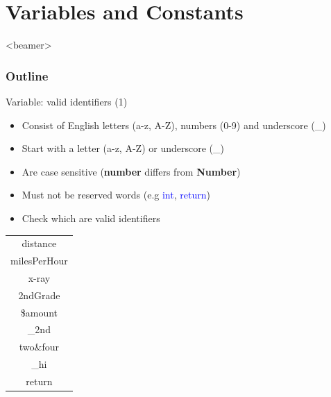 \section{Variables and Constants}
\label{sec:vars}
\begin{frame}<beamer>
    \frametitle{Outline}
    \tableofcontents[currentsection]
\end{frame}

\begin{frame}[fragile]{Variable: valid identifiers (1)}
	\begin{itemize}
		\item {Consist of English letters (a-z, A-Z), numbers (0-9) and underscore (\_)}
		\item {Start with a letter (a-z, A-Z) or underscore (\_)}
		\item {Are case sensitive (\textbf{number} differs from \textbf{Number})}
		\item {Must not be reserved words (e.g \textcolor{blue}{int}, \textcolor{blue}{return})}
		\item {Check which are valid identifiers}
	\end{itemize}
	\begin{table}
	\begin{center}
		\begin{tabular}{|c|}
		\hline
		distance \\
		milesPerHour \\
		x-ray \\
		2ndGrade\\
		\$amount \\
		\_2nd \\
		two\&four \\
		\_hi \\
		return \\ \hline
		\end{tabular}
	\end{center}
	\end{table}
\end{frame}


